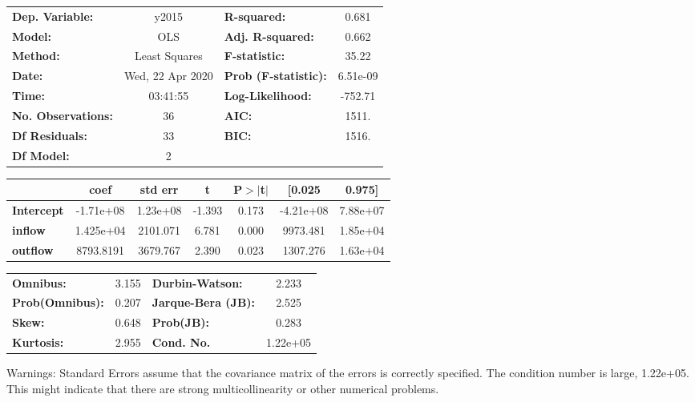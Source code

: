 \begin{center}
\begin{tabular}{lclc}
\toprule
\textbf{Dep. Variable:}    &      y2015       & \textbf{  R-squared:         } &     0.681   \\
\textbf{Model:}            &       OLS        & \textbf{  Adj. R-squared:    } &     0.662   \\
\textbf{Method:}           &  Least Squares   & \textbf{  F-statistic:       } &     35.22   \\
\textbf{Date:}             & Wed, 22 Apr 2020 & \textbf{  Prob (F-statistic):} &  6.51e-09   \\
\textbf{Time:}             &     03:41:55     & \textbf{  Log-Likelihood:    } &   -752.71   \\
\textbf{No. Observations:} &          36      & \textbf{  AIC:               } &     1511.   \\
\textbf{Df Residuals:}     &          33      & \textbf{  BIC:               } &     1516.   \\
\textbf{Df Model:}         &           2      & \textbf{                     } &             \\
\bottomrule
\end{tabular}
\begin{tabular}{lcccccc}
                   & \textbf{coef} & \textbf{std err} & \textbf{t} & \textbf{P$> |$t$|$} & \textbf{[0.025} & \textbf{0.975]}  \\
\midrule
\textbf{Intercept} &    -1.71e+08  &     1.23e+08     &    -1.393  &         0.173        &    -4.21e+08    &     7.88e+07     \\
\textbf{inflow}    &    1.425e+04  &     2101.071     &     6.781  &         0.000        &     9973.481    &     1.85e+04     \\
\textbf{outflow}   &    8793.8191  &     3679.767     &     2.390  &         0.023        &     1307.276    &     1.63e+04     \\
\bottomrule
\end{tabular}
\begin{tabular}{lclc}
\textbf{Omnibus:}       &  3.155 & \textbf{  Durbin-Watson:     } &    2.233  \\
\textbf{Prob(Omnibus):} &  0.207 & \textbf{  Jarque-Bera (JB):  } &    2.525  \\
\textbf{Skew:}          &  0.648 & \textbf{  Prob(JB):          } &    0.283  \\
\textbf{Kurtosis:}      &  2.955 & \textbf{  Cond. No.          } & 1.22e+05  \\
\bottomrule
\end{tabular}
\end{center}

Warnings: \newline
 [1] Standard Errors assume that the covariance matrix of the errors is correctly specified. \newline
 [2] The condition number is large, 1.22e+05. This might indicate that there are \newline
 strong multicollinearity or other numerical problems.